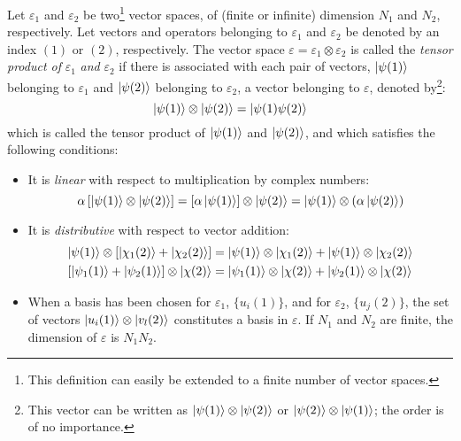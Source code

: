 \begin{definition}
    Let $\varepsilon_1$ and $\varepsilon_2$ be two\footnote{This definition can easily be extended to a finite number of vector spaces.} vector spaces, of (finite or infinite) dimension $N_1$ and $N_2$, respectively. Let vectors and operators belonging to $\varepsilon_1$ and $\varepsilon_2$ be denoted by an index $(1)$ or $(2)$, respectively. The vector space $\varepsilon = \varepsilon_1 \otimes \varepsilon_2$ is called the \textit{tensor product of} $\varepsilon_1$ \textit{and} $\varepsilon_2$ if there is associated with each pair of vectors, $\ket{\psi(1)}$ belonging to $\varepsilon_1$ and $\ket{\psi(2)}$ belonging to $\varepsilon_2$, a vector belonging to $\varepsilon$, denoted by\footnote{This vector can be written as $\ket{\psi(1)}\otimes\ket{\psi(2)}$ or $\ket{\psi(2)}\otimes\ket{\psi(1)}$; the order is of no importance.}:
    \begin{equation}
        \ket{\psi(1)}\otimes\ket{\psi(2)} = \ket{\psi(1)\psi(2)} 
    \end{equation}
    which is called the tensor product of $\ket{\psi(1)}$ and $\ket{\psi(2)}$, and which satisfies the following conditions:
    \begin{itemize}
        \item It is \textit{linear} with respect to multiplication by complex numbers:
        \begin{equation}
            \alpha\left[\ket{\psi(1)}\otimes\ket{\psi(2)}\right] = \left[\alpha\ket{\psi(1)}\right]\otimes\ket{\psi(2)} = \ket{\psi(1)}\otimes(\alpha\ket{\psi(2)})
        \end{equation}
        \item It is \textit{distributive} with respect to vector addition:
        \begin{equation}
            \begin{split}
                \ket{\psi(1)}\otimes \left[\ket{\chi_1(2)} + \ket{\chi_2(2)}\right] &= \ket{\psi(1)}\otimes\ket{\chi_1(2)} + \ket{\psi(1)}\otimes\ket{\chi_2(2)}\\
                \left[\ket{\psi_1(1)} + \ket{\psi_2(1)}\right]\otimes\ket{\chi(2)} &= \ket{\psi_1(1)}\otimes\ket{\chi(2)} + \ket{\psi_2(1)}\otimes\ket{\chi(2)}   
            \end{split}
        \end{equation}
        \item When a basis has been chosen for $\varepsilon_1$, $\{u_i(1)\}$, and for $\varepsilon_2$, $\{u_j(2)\}$, the set of vectors $\ket{u_i(1)}\otimes\ket{v_l(2)}$ constitutes a basis in $\varepsilon$. If $N_1$ and $N_2$ are finite, the dimension of $\varepsilon$ is $N_1N_2$.
    \end{itemize}
\end{definition}

